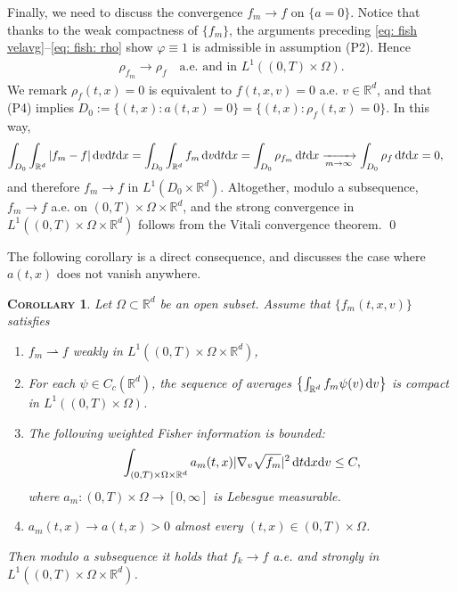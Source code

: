 \documentclass[10pt, reqno]{amsart}
\theoremstyle{plain}
\newtheorem{corollary}[theorem]{\normalfont \scshape Corollary}
\theoremstyle{definition}
\theoremstyle{remark}
\renewenvironment{proof}[1][\proofname]{\noindent{\scshape #1.\quad}}{\qed}
\numberwithin{equation}{section}
\newcommand{\R}{\mathbb{R}}
\newcommand{\dx}{\textnormal{d}x}
\newcommand{\dv}{\textnormal{d}v}
\newcommand{\dt}{\textnormal{d}t}
\newcommand{\weakto}{\rightharpoonup}
\newcommand{\intr}{\int_{\R^d}}
\begin{document}
\begin{proof}[Proof of Proposition \ref{prop: weighted fisher}]
    Finally, we need to discuss the convergence $f_m\to f$ on $\{a = 0\}$. Notice that thanks to the weak compactness of $\{f_m\}$, the arguments preceding \eqref{eq: fish velavg}--\eqref{eq: fish: rho} show $\varphi\equiv 1$ is admissible in assumption (P2). Hence
    \begin{align*}
        \rho_{f_m}\to \rho_f \quad \text{a.e. and in }L^1((0,T)\times\Omega).
    \end{align*}
    We remark $\rho_f(t,x) = 0$ is equivalent to $f(t,x,v) = 0$ a.e. $v\in \R^d$, and that (P4) implies $D_0 := \{(t,x):a(t,x)=0 \} = \{(t,x): \rho_f(t,x) = 0\}$. In this way,
    \begin{align*}
        \int_{D_0} \intr |f_m - f| \,\dv\dt\dx &= \int_{D_0} \intr f_m \,\dv\dt\dx  = \int_{D_0} \rho_{f_m} \,\dt\dx  \xrightarrow[m\to\infty]{} \int_{D_0} \rho_f \,\dt\dx  = 0,
    \end{align*}
    and therefore $f_m\to f$ in $L^1(D_0\times \R^d)$.     Altogether, modulo a subsequence, $f_m\to f$ a.e. on $(0,T)\times\Omega\times\R^d$,  and the strong convergence in $L^1((0,T)\times\Omega\times\R^d)$ follows from
    the Vitali convergence theorem.
    \end{proof}

The following corollary is a direct consequence, and discusses the case where $a(t,x)$ does not vanish anywhere.

\begin{corollary} 
    Let $\Omega\subset\R^d$ be an open subset. Assume that $\{f_m(t,x,v)\}$ satisfies
    \begin{enumerate}
        \item[(P1)] $f_m \weakto f$ weakly in $L^1((0,T)\times\Omega\times\R^d)$,
        \item[(P2)] For each $\psi \in C_c(\R^d)$, the sequence of averages $\left\{ \int_{\R^d} f_m \psi(v)\,\dv \right\}$ is compact in $L^1((0,T)\times\Omega)$.
        \item[(P3)] The following weighted Fisher information is bounded:
        \begin{align*}
            \int_{(0,T)\times\Omega\times\R^d} a_m(t,x) |\nabla_v \sqrt{f_m}|^2 \,\dt\dx\dv \le C,
        \end{align*}
        where $a_m:(0,T)\times\Omega\to [0,\infty]$ is Lebesgue measurable.
        \item[(P4')] $a_m(t,x) \to a(t,x) > 0$ almost every $(t,x)\in (0,T)\times \Omega$.
    \end{enumerate}
    Then modulo a subsequence it holds that $f_k \to f$ a.e. and strongly in $L^1((0,T)\times\Omega\times\R^d)$.
\end{corollary}
\end{document}
